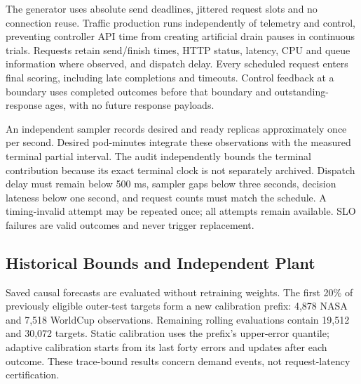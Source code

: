 \documentclass[10pt,twocolumn,a4paper]{article}
\begin{document}
\begin{table}[t]\centering\small\setlength{\tabcolsep}{3pt}
\caption{Each cycle spans eight seconds. Batch workloads offer traffic for five seconds and pause for three; continuous traffic uses all eight. Work multipliers rise to 1.8 in cycles 13--16 of the previous batch, to 1.6 in cycles 11--13 of abrupt batch, and to 1.6 in cycles 11--16 of continuous traffic. Other cycles use unit work.}\label{tab:workloads}
\ifdim\wd\databox>\textwidth\relax\resizebox{\textwidth}{!}{\usebox{\databox}}\else\usebox{\databox}\fi
\end{table}


The generator uses absolute send deadlines, jittered request slots and no connection reuse. Traffic production runs independently of telemetry and control, preventing controller API time from creating artificial drain pauses in continuous trials. Requests retain send/finish times, HTTP status, latency, CPU and queue information where observed, and dispatch delay. Every scheduled request enters final scoring, including late completions and timeouts. Control feedback at a boundary uses completed outcomes before that boundary and outstanding-response ages, with no future response payloads.

An independent sampler records desired and ready replicas approximately once per second. Desired pod-minutes integrate these observations with the measured terminal partial interval. The audit independently bounds the terminal contribution because its exact terminal clock is not separately archived. Dispatch delay must remain below 500 ms, sampler gaps below three seconds, decision lateness below one second, and request counts must match the schedule. A timing-invalid attempt may be repeated once; all attempts remain available. SLO failures are valid outcomes and never trigger replacement.

\subsection{Historical Bounds and Independent Plant}
Saved causal forecasts are evaluated without retraining weights. The first 20\% of previously eligible outer-test targets form a new calibration prefix: 4,878 NASA and 7,518 WorldCup observations. Remaining rolling evaluations contain 19,512 and 30,072 targets. Static calibration uses the prefix's upper-error quantile; adaptive calibration starts from its last forty errors and updates after each outcome. These trace-bound results concern demand events, not request-latency certification.
\end{document}

